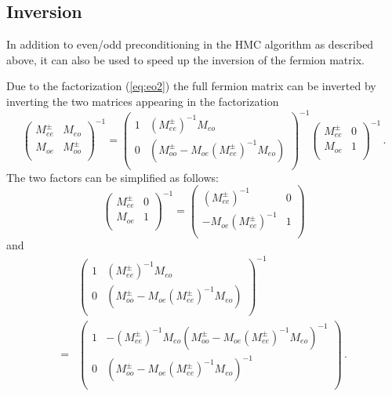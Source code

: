 \subsection{Inversion}

In addition to even/odd preconditioning in the HMC algorithm as
described above, it can also be used to speed up the inversion of the
fermion matrix. 

Due to the factorization (\ref{eq:eo2}) the full fermion matrix can be
inverted by inverting the two matrices appearing in the factorization
\[
\begin{pmatrix}
  M_{ee}^\pm & M_{eo} \\
  M_{oe}    & M_{oo}^\pm \\
\end{pmatrix}^{-1}
=
\begin{pmatrix}
  1       & (M_{ee}^\pm)^{-1}M_{eo}\\
  0       & (M_{oo}^\pm-M_{oe}(M_{ee}^\pm)^{-1}M_{eo})\\
\end{pmatrix}^{-1}
\begin{pmatrix}
  M_{ee}^\pm & 0 \\
  M_{oe}   & 1 \\
\end{pmatrix}^{-1}\, .
\]
The two factors can be simplified as follows:
\[
\begin{pmatrix}
  M_{ee}^\pm & 0 \\
  M_{oe}   & 1 \\
\end{pmatrix}^{-1}
=
\begin{pmatrix}
      (M_{ee}^\pm)^{-1} & 0 \\
      -M_{oe} (M_{ee}^{\pm})^{-1}  & 1 \\
    \end{pmatrix}
\]
and 
\[
\begin{split}
  &\begin{pmatrix}
    1       & (M_{ee}^\pm)^{-1}M_{eo}\\
    0       & (M_{oo}^\pm-M_{oe}(M_{ee}^\pm)^{-1}M_{eo})\\
  \end{pmatrix}^{-1}
  \\=&
  \begin{pmatrix}
    1       & -(M_{ee}^\pm)^{-1}M_{eo}(M_{oo}^\pm-M_{oe}(M_{ee}^\pm)^{-1}M_{eo})^{-1}  \\
    0       & (M_{oo}^\pm-M_{oe}(M_{ee}^\pm)^{-1}M_{eo})^{-1}\\
  \end{pmatrix}\, .
\end{split}
\]
